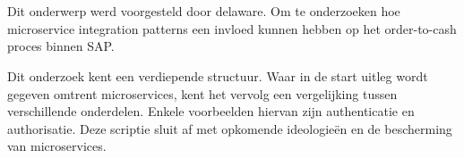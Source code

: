 
%
%

%



\chapter*{}


Dit onderwerp werd voorgesteld door delaware. Om te onderzoeken hoe microservice integration patterns een invloed kunnen hebben op het order-to-cash proces binnen SAP. 

Dit onderzoek kent een verdiepende structuur. Waar in de start uitleg wordt gegeven omtrent microservices, kent het vervolg een vergelijking tussen verschillende onderdelen. Enkele voorbeelden hiervan zijn authenticatie en authorisatie. Deze scriptie sluit af met opkomende ideologieën en de bescherming van microservices.

